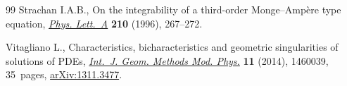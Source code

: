 \documentclass[10pt,a4paper]{amsart}
\numberwithin{equation}{section}
\begin{document}
\begin{thebibliography}{99}
Strachan I.A.B., On the integrability of a third-order {M}onge--{A}mp\`ere type
 equation, \href{http://dx.doi.org/10.1016/0375-9601(95)00944-2}{\textit{Phys. Lett.~A}} \textbf{210} (1996), 267--272.

Vitagliano L., Characteristics, bicharacteristics and geometric singularities
 of solutions of {PDE}s, \href{http://dx.doi.org/10.1142/S0219887814600391}{\textit{Int.~J. Geom. Methods Mod. Phys.}} \textbf{11}
 (2014), 1460039, 35~pages, \href{http://arxiv.org/abs/1311.3477}{arXiv:1311.3477}.

\end{thebibliography}
\end{document}
